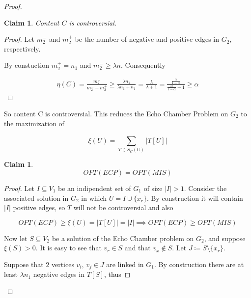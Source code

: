 \documentclass{article}
\newtheorem{claim}[theorem]{Claim}
\begin{document}
\begin{proof}
	\begin{claim}
		\label{th:claim-controversial}
		Content $C$ is controversial.
	\end{claim}
	\begin{proof}
		Let $m_{2}^{-} $ and $m_{2}^{+} $ be the number of negative and
		positive edges in $G_2$, respectively.

		By constuction $m_{2}^{+} = n_{1} $ and $m_{2}^{-} \geq \lambda n$.
		Consequently

		\begin{align}
			\eta(C) = \frac{m_{2}^{-} }{m_{2}^{-} +
				m_{2}^{+} } \geq \frac{\lambda n_{1}}{\lambda n_{1}
				+ n_{1} } = \frac{\lambda }{\lambda + 1} =
			\frac{ \frac{\alpha }{1 - \alpha }  }{ \frac{\alpha }{1 - \alpha }
				+ 1 } \geq \alpha
		\end{align}
	\end{proof}

	So content C is controversial. This reduces the Echo Chamber Problem on $G_2$ to the maximization of

	\begin{equation}
		\label{eq:score}
		\xi(U) = \sum^{}_{T \in S_{C}(U) } | T[U] |
	\end{equation}

	\begin{claim}
		\label{th:opt-equality}
		\begin{equation}
			OPT(ECP) = OPT(MIS)
		\end{equation}
	\end{claim}

	\begin{proof}
		Let $I \subseteq V_{1} $ be an indipendent set of $G_1$ of size $|I| >
			1$. Consider the associated solution in $G_2$ in which $U = I
			\cup \{x_{r} \}$. By construction it will contain $|I|$ positive
		edges, so $T$ will not be controversial and also

		\begin{equation}
			OPT(ECP) \geq \xi(U) = |T[U]| = |I| \implies OPT(ECP) \geq OPT(MIS)
		\end{equation}

		Now let $S \subseteq V_2$ be a solution of the Echo Chamber problem on
		$G_2$, and suppose $\xi(S) > 0$. It is easy to see that $v_{r} \in S$
		and that $v_{x} \not\in S $. Let $J \coloneqq S \setminus \{x_r\}$.

		Suppose that $2$ vertices $v_{i} $, $v_{j} \in J$ are linked in
		$G_1$. By construction there are at least $\lambda n_1$ negative edges
		in $T[S]$, thus


\end{proof}
\end{proof}
\end{document}
